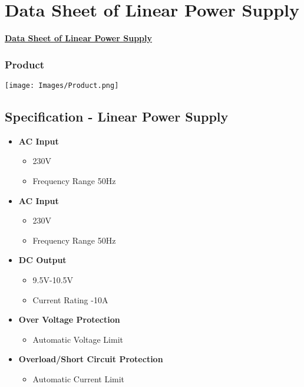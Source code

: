 \documentclass[11pt,a4paper]{article}
\begin{document}
\newpage
\section{Data Sheet of Linear Power Supply}
\vspace{0.3in}
\begin{center}
    \LARGE \textbf{\underline {Data Sheet of Linear Power Supply}}
\end{center}

\subsubsection*{\large \textbf{Product}}
\texttt{[image: Images/Product.png]}

 \subsection*{\Large \textbf{Specification - Linear Power Supply}}
\vspace{0.1in}
\begin{itemize}
    \item \textbf{AC Input}
            \begin{itemize}
                \item 230V
                \item Frequency Range 50Hz
            \end{itemize}
    \item   \textbf{AC Input}
            \begin{itemize}
                \item 230V
                \item Frequency Range 50Hz
            \end{itemize}
    \item   \textbf{DC Output}
            \begin{itemize}
                \item 9.5V-10.5V 
                \item Current Rating -10A
            \end{itemize}
    \item \textbf{Over Voltage Protection}
            \begin{itemize}
                \item Automatic Voltage Limit
            \end{itemize}
    \item \textbf{Overload/Short Circuit Protection}
            \begin{itemize}
                \item Automatic Current Limit
            \end{itemize}
\end{itemize}
\end{document}
